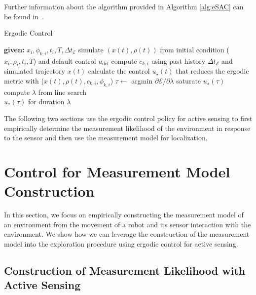 \documentclass[conference]{IEEEtran}
\begin{document}
Further information about the algorithm provided in Algorithm \ref{alg:eSAC} can be found in~\cite{mavrommati2017eSAC}.

\begin{algorithm}
\caption{Ergodic Control} \label{alg:eSAC}
\centering
\begin{algorithmic}[1]
\State \textbf{given:} $x_i, \phi_{k,i}, t_i, T, \Delta t_\mathcal{E}$
\State  simulate $(x(t), \rho(t))$ from initial condition ($x_i, \rho_i, t_{i}, T$) and default control $u_\text{def}$
\State  compute $c_{k,i}$ using past history $\Delta t_\mathcal{E}$ and simulated trajectory $x(t)$
\State  calculate the control $u_\star (t)$ that reduces the ergodic metric with ($x(t), \rho(t), c_{k,i}, \phi_{k,i}$)
\State  $\tau \gets $ argmin $\partial \mathcal{E} / \partial \lambda$
\State saturate $u_\star(\tau)$
\State  compute $\lambda$ from line search\\
\Return$u_*(\tau)$ for duration $\lambda$
\end{algorithmic}
\end{algorithm}

The following two sections use the ergodic control policy for active sensing to first empirically determine the measurement likelihood of the environment in response to the sensor and then use the measurement model for localization.


\section{Control for Measurement Model Construction}
\label{sec:shape_estimation}

In this section, we focus on empirically constructing the measurement model of an environment from the movement of a robot and its sensor interaction with the environment.
We show how we can leverage the construction of the measurement model into the exploration procedure using ergodic control for active sensing.

\subsection{Construction of Measurement Likelihood with Active Sensing}
\end{document}
